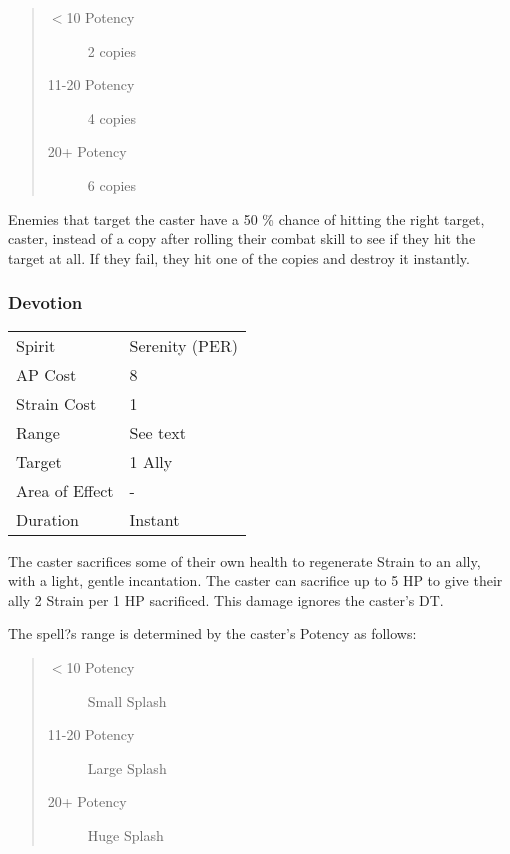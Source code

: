 \documentclass[11pt,a4paper,twocolumn]{book}
\begin{document}
\begin{quote}
	\begin{description}
		\item[$<$10 Potency] 	2 copies
		\item[11-20 Potency] 4 copies
		\item[20+ Potency] 	    6 copies
	\end{description}	
\end{quote}

Enemies that target the caster have a 50 \% chance of hitting the right target, caster, instead of a copy after rolling their combat skill to see if they hit the target at all. If they fail, they hit one of the copies and destroy it instantly.

\subsubsection*{Devotion}
{
	\begin{tabu} to 75mm{| X[l,4] | X[l,7] |}
		\hline
		Spirit         & Serenity (PER) \\
		AP Cost        & 8              \\
		Strain Cost    & 1              \\
		Range          & See text    \\
		Target         & 1 Ally       \\
		Area of Effect & -              \\
		Duration       & Instant        \\ \hline
	\end{tabu}
	
}
\medskip

The caster sacrifices some of their own health to regenerate Strain to an ally, with a light, gentle incantation. The caster can sacrifice up to 5 HP to give their ally 2 Strain per 1 HP sacrificed. This damage ignores the caster's DT.

The spell?s range is determined by the caster's Potency as follows:
\begin{quote}
	\begin{description}
		\item[$<$10 Potency]	Small Splash
		\item[11-20 Potency]	Large Splash
		\item[20+ Potency]		Huge Splash
	\end{description}	
\end{quote}
\end{document}
